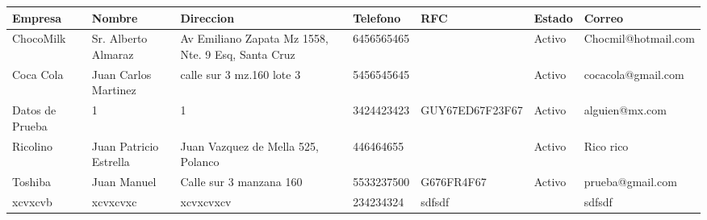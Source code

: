 \documentclass[a4paper,12pt]{article}
\begin{document}
\footnotesize  
\setlength\LTleft{-30pt}
 \setlength\LTright{-100pt}
  \begin{landscape}
 \thispagestyle{empty}
\begin{longtable}{|p{2.5cm}|p{2.5cm}|p{2.5cm}|p{2cm}|p{5cm}|p{1cm}|p{5cm}|}
\hline
\textbf{Empresa} & \textbf{Nombre} & \textbf{Direccion} & \textbf{Telefono} & \textbf{RFC} & \textbf{Estado} & \textbf{Correo}\\ \hline \hline ChocoMilk & Sr. Alberto Almaraz & Av Emiliano Zapata Mz 1558, Nte. 9 Esq, Santa Cruz & 6456565465 &  & Activo & Chocmil@hotmail.com \\ \hline 
Coca Cola & Juan Carlos Martinez & calle sur 3 mz.160 lote 3 & 5456545645 &  & Activo & cocacola@gmail.com \\ \hline 
Datos de Prueba & 1 & 1 & 3424423423 & GUY67ED67F23F67 & Activo & alguien@mx.com \\ \hline 
Ricolino & Juan Patricio Estrella & Juan Vazquez de Mella 525, Polanco & 446464655 &  & Activo & Rico rico \\ \hline 
Toshiba & Juan Manuel & Calle sur 3 manzana 160 & 5533237500 & G676FR4F67 & Activo & prueba@gmail.com \\ \hline 
xcvxcvb & xcvxcvxc & xcvxcvxcv & 234234324 & sdfsdf &  & sdfsdf \\ \hline 
\end{longtable}
\thispagestyle{empty}
\end{landscape}
\end{document}

